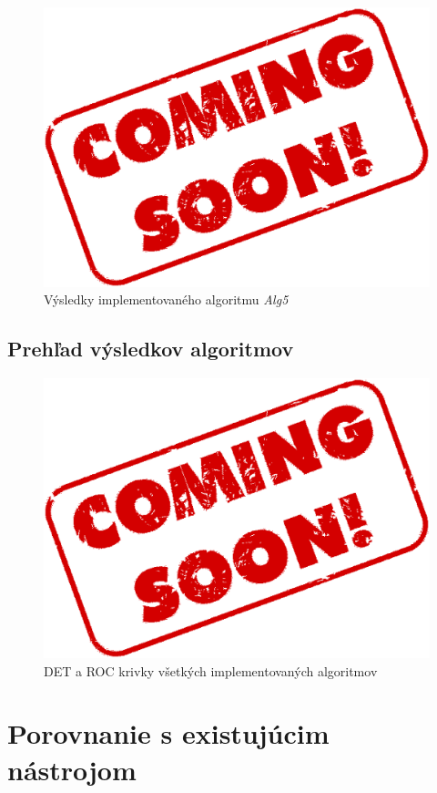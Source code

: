 \documentclass[11pt,a4paper]{article}
\begin{document}
\clearpage

\begin{figure}[ht!]
	\centering
	\includegraphics[width=12cm]{fig/alg5.eps}
	\caption{\label{fig:alg5} Výsledky implementovaného algoritmu \emph{Alg5}}
\end{figure}

\clearpage
\subsection{Prehľad výsledkov algoritmov} \label{vysledky}

\begin{figure}[ht!]
	\centering
	\includegraphics[width=12cm]{fig/all.eps}
	\caption{\label{fig:all} DET a ROC krivky všetkých implementovaných algoritmov}
\end{figure}

\clearpage
\section{Porovnanie s existujúcim nástrojom} \label{konalio}
\end{document}
